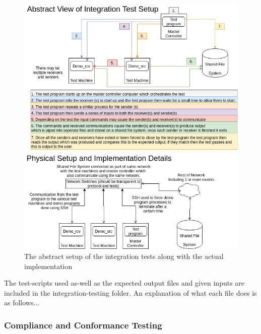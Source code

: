 \documentclass[11pt,a4paper]{report}
\begin{document}
	\begin{figure}[H]
		\label{integration_test_setup}
		\includegraphics[width=\textwidth]{SH-Project-Intergration-Tests-Abstract-View.png}
		\caption{The abstract setup of the integration tests along with the actual implementation}
	\end{figure}

The test-scripts used as-well as the expected output files and given inputs are included in the integration-testing folder. An explanation of what each file does is as follows...
	
	\subsubsection{Compliance and Conformance Testing}
	
\end{document}
